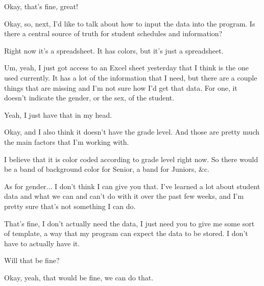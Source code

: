 \documentclass[appendix.tex]{subfiles}
\begin{document}
\begin{client}
Okay, that's fine, great!
\end{client}

\begin{interviewer}
Okay, so, next, I'd like to talk about how to input the data into the program.
Is there a central source of truth for student schedules and information?
\end{interviewer}

\begin{client}
Right now it's a spreadsheet.
It has colors, but it's just a spreadsheet.
\end{client}

\begin{interviewer}
Um, yeah, I just got access to an Excel sheet yesterday that I think is the one used currently.
It has a lot of the information that I need, but there are a couple things that are missing and I'm not sure how I'd get that data.
For one, it doesn't indicate the gender, or the sex, of the student.
\end{interviewer}

\begin{client}
Yeah, I just have that in my head.
\end{client}

\begin{interviewer}
Okay, and I also think it doesn't have the grade level.
And those are pretty much the main factors that I'm working with.
\end{interviewer}

\begin{client}
I believe that it is color coded according to grade level right now.
So there would be a band of background color for Senior, a band for Juniors, \&c.

As for gender... I don't think I can give you that.
I've learned a lot about student data and what we can and can't do with it over the past few weeks, and I'm pretty sure that's not something I can do.
\end{client}

\begin{interviewer}
That's fine, I don't actually need the data, I just need you to give me some sort of template, a way that my program can expect the data to be stored.
I don't have to actually have it.

Will that be fine?
\end{interviewer}

\begin{client}
Okay, yeah, that would be fine, we can do that.
\end{client}
\end{document}
